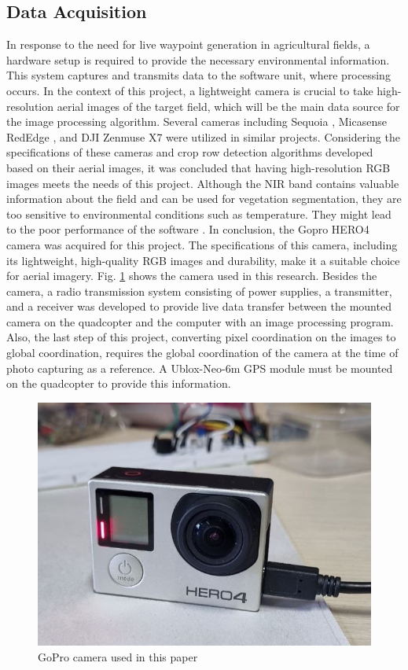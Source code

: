 \documentclass[conference]{IEEEtran}
\begin{document}
	\subsection{Data Acquisition}\label{Data Acquisition}
	In response to the need for live waypoint generation in agricultural fields, a hardware setup is required to provide the necessary environmental information. This system captures and transmits data to the software unit, where processing occurs. In the context of this project, a lightweight camera is crucial to take high-resolution aerial images of the target field, which will be the main data source for the image processing algorithm. Several cameras including Sequoia
	\cite{b9,b4,b7,b6}, Micasense RedEdge
	\cite{b9,b14}, and DJI Zenmuse X7
	\cite{b5} were utilized in similar projects. Considering the specifications of these cameras and crop row detection algorithms developed based on their aerial images, it was concluded that having high-resolution RGB images meets the needs of this project. Although the NIR band contains valuable information about the field and can be used for vegetation segmentation, they are too sensitive to environmental conditions such as temperature. They might lead to the poor performance of the software
	\cite{b5}. In conclusion, the Gopro HERO4 camera was acquired for this project. The specifications of this camera, including its lightweight, high-quality RGB images and durability, make it a suitable choice for aerial imagery. Fig.
	\ref{gopro} shows the camera used in this research.
	Besides the camera, a radio transmission system consisting of power supplies, a transmitter, and a receiver was developed to provide live data transfer between the mounted camera on the quadcopter and the computer with an image processing program.
	Also, the last step of this project, converting pixel coordination on the images to global coordination, requires the global coordination of the camera at the time of photo capturing as a reference. A Ublox-Neo-6m GPS module must be mounted on the quadcopter to provide this information.
	
	\begin{figure}[t]
		\centering
		\includegraphics[width=0.7\linewidth]{GoPro.jpg}
		\caption{GoPro camera used in this paper}
		\label{gopro}
	\end{figure}
	
\end{document}

